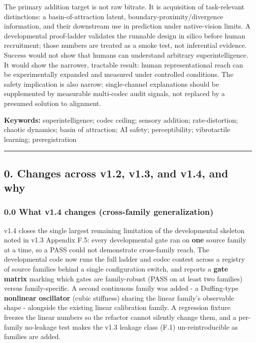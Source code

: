 \documentclass[
  11pt,
]{article}
\begin{document}
The primary addition target is not raw bitrate. It is
acquisition of task-relevant distinctions: a
basin-of-attraction latent,
boundary-proximity/divergence information, and their
downstream use in prediction under native-vision
limits. A developmental proof-ladder validates the
runnable design in silico before human recruitment;
those numbers are treated as a smoke test, not
inferential evidence. Success would not show that
humans can understand arbitrary superintelligence. It
would show the narrower, tractable result: human
representational reach can be experimentally expanded
and measured under controlled conditions. The safety
implication is also narrow: single-channel explanations
should be supplemented by measurable multi-codec audit
signals, not replaced by a presumed solution to
alignment.

\textbf{Keywords:} superintelligence; codec ceiling;
sensory addition; rate-distortion; chaotic dynamics;
basin of attraction; AI safety; perceptibility;
vibrotactile learning; preregistration

\begin{center}\rule{0.5\linewidth}{0.5pt}\end{center}

\subsection{0. Changes across v1.2, v1.3, and v1.4, and
why}\label{changes-across-v1.2-v1.3-and-v1.4-and-why}

\subsubsection{0.0 What v1.4 changes (cross-family
generalization)}\label{what-v1.4-changes-cross-family-generalization}

v1.4 closes the single largest remaining limitation of
the developmental skeleton noted in v1.3 Appendix F.5:
every developmental gate ran on \textbf{one} source
family at a time, so a PASS could not demonstrate
cross-family reach. The developmental code now runs the
full ladder and codec contest across a registry of
source families behind a single configuration switch,
and reports a \textbf{gate matrix} marking which gates
are family-robust (PASS on at least two families)
versus family-specific. A second continuous family was
added - a Duffing-type \textbf{nonlinear oscillator}
(cubic stiffness) sharing the linear family's
observable shape - alongside the existing linear
calibration family. A regression fixture freezes the
linear numbers so the refactor cannot silently change
them, and a per-family no-leakage test makes the v1.3
leakage class (F.1) un-reintroducible as families are
added.
\end{document}
